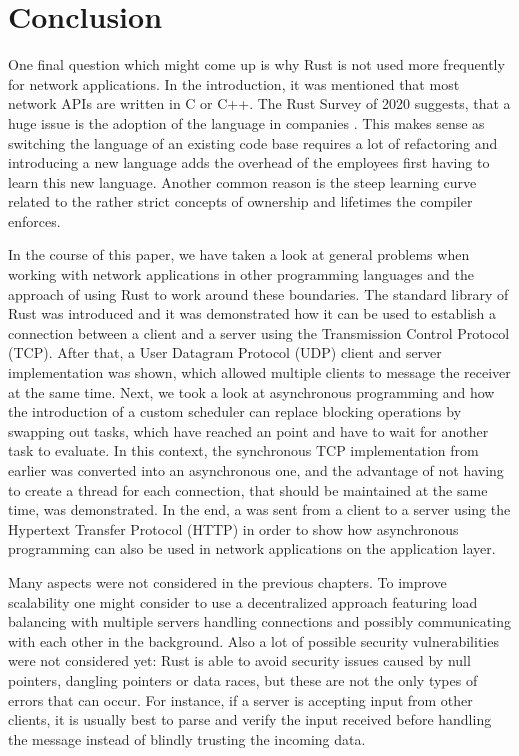 
\section{Conclusion}
One final question which might come up is why Rust is not used more frequently for network applications. In the
introduction, it was mentioned that most network APIs are written in C or C++. The Rust Survey of 2020 suggests, that a
huge issue is the adoption of the language in companies \cite{rust-survey}. This makes sense as switching the language
of an existing code base requires a lot of refactoring and introducing a new language adds the overhead of the
employees first having to learn this new language. Another common reason is the steep learning curve related to the
rather strict concepts of ownership and lifetimes the compiler enforces.

In the course of this paper, we have taken a look at general problems when working with network applications in other
programming languages and the approach of using Rust to work around these boundaries. The standard library of Rust was
introduced and it was demonstrated how it can be used to establish a connection between a client and a server using the
Transmission Control Protocol (TCP). After that, a User Datagram Protocol (UDP) client and server implementation was
shown, which allowed multiple clients to message the receiver at the same time. Next, we took a look at asynchronous
programming and how the introduction of a custom scheduler can replace blocking operations by swapping out tasks, which
have reached an  point and have to wait for another task to evaluate. In this context, the synchronous TCP
implementation from earlier was converted into an asynchronous one, and the advantage of not having to create a thread
for each connection, that should be maintained at the same time, was demonstrated. In the end, a  was sent
from a client to a server using the Hypertext Transfer Protocol (HTTP) in order to show how asynchronous programming
can also be used in network applications on the application layer.

Many aspects were not considered in the previous chapters. To improve scalability one might consider to use a
decentralized approach featuring load balancing with multiple servers handling connections and possibly communicating
with each other in the background. Also a lot of possible security vulnerabilities were not considered yet: Rust is
able to avoid security issues caused by null pointers, dangling pointers or data races, but these are not the only
types of errors that can occur. For instance, if a server is accepting input from other clients, it is usually best to
parse and verify the input received before handling the message instead of blindly trusting the incoming data.

